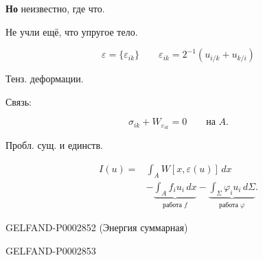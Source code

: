 \textbf{Но} неизвестно, где что.

Не учли ещё, что упругое тело.

\begin{center}\end{center}

\begin{equation*}\varepsilon=\{\varepsilon_{ik}\}\qquad\varepsilon_{ik}=2^{-1}(u_{i/k}+u_{k/i})\end{equation*}

\begin{center}Тенз. деформации.\end{center}





Связь:

\begin{equation*}\sigma_{ik}+W_{\varepsilon_{ik}}=0\qquad\text{на }A.\end{equation*}

Пробл. сущ. и единств.

\begin{equation*}\begin{aligned}
I(u)={}&\int_A W[x,\varepsilon(u)]\,dx\\
&-\underbrace{\int_A f_i u_i\,dx}_{\text{работа }f}
-\underbrace{\int_\Sigma\varphi_i u_i\,d\Sigma}_{\text{работа }\varphi}.
\end{aligned}\end{equation*}

\begin{GelfandAdjacentEvidence}{GELFAND-P000285}{2}
(Энергия суммарная)

\end{GelfandAdjacentEvidence}


\begin{GelfandAdjacentEvidence}{GELFAND-P000285}{3}

\end{GelfandAdjacentEvidence}


